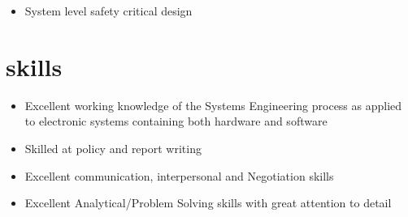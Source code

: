\documentclass[]{friggeri-cv} %
\begin{document}
\begin{itemize}
    \item System level safety critical design
\end{itemize}

\section{skills}
\begin{itemize}
    \item Excellent working knowledge of the Systems Engineering process as applied to electronic systems containing both hardware and software
    \item Skilled at policy and report writing
    \item Excellent communication, interpersonal and Negotiation skills
    \item Excellent Analytical/Problem Solving skills with great attention to detail
\end{itemize}
\end{document}
